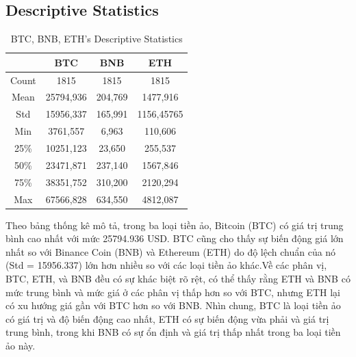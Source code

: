 \documentclass[conference]{IEEEtran}
\begin{document}
\subsection{Descriptive Statistics}
\begin{table}[H]
  \centering
  \caption{BTC, BNB, ETH’s Descriptive Statistics}
\begin{tabular}{|c|c|c|c|}
    \hline
     & BTC & BNB & ETH \\ \hline
     Count & 1815 & 1815 & 1815 \\ \hline
     Mean & 25794,936 & 204,769 & 1477,916\\ \hline
     Std & 15956,337 & 165,991 & 1156,45765\\ \hline
     Min & 3761,557 & 6,963 & 110,606\\ \hline
     25\% & 10251,123 & 23,650 & 255,537\\ \hline
     50\% & 23471,871 & 237,140 & 1567,846\\ \hline
     75\% & 38351,752 & 310,200 & 2120,294\\ \hline
     Max & 67566,828 & 634,550 & 4812,087\\ \hline
\end{tabular}
\end{table}

Theo bảng thống kê mô tả, trong ba loại tiền ảo, Bitcoin (BTC) có giá trị trung bình cao nhất với mức 25794.936 USD. BTC cũng cho thấy sự biến động giá lớn nhất so với Binance Coin (BNB) và Ethereum (ETH) do độ lệch chuẩn của nó (Std = 15956.337) lớn hơn nhiều so với các loại tiền ảo khác.Về các phân vị, BTC, ETH, và BNB đều có sự khác biệt rõ rệt, có thể thấy rằng ETH và BNB có mức trung bình và mức giá ở các phân vị thấp hơn so với BTC, nhưng ETH lại có xu hướng giá gần với BTC hơn so với BNB. Nhìn chung, BTC là loại tiền ảo có giá trị và độ biến động cao nhất, ETH có sự biến động vừa phải và giá trị trung bình, trong khi BNB có sự ổn định và giá trị thấp nhất trong ba loại tiền ảo này.
\end{document}
